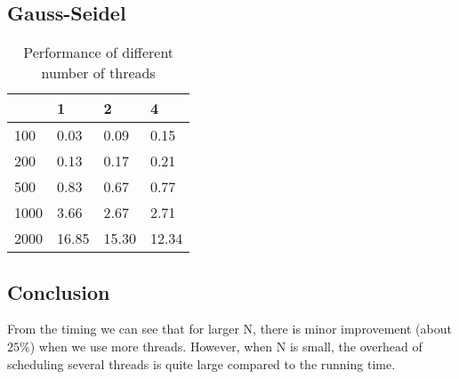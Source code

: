 \documentclass{article}
\begin{document}
    \subsection{Gauss-Seidel}
    \begin{table}[htb!]
        \centering
        \begin{tabular}{|l|l|l|l|}
        \hline
         & 1 & 2 & 4 \\ \hline
        100 & 0.03 & 0.09 & 0.15 \\ \hline
        200 & 0.13 & 0.17 & 0.21 \\ \hline
        500 & 0.83 & 0.67 & 0.77 \\ \hline
        1000 & 3.66 & 2.67 & 2.71 \\ \hline
        2000 & 16.85 & 15.30 & 12.34 \\ \hline
        \end{tabular}
        \caption{Performance of different number of threads}
    \end{table}
    \subsection{Conclusion}
        From the timing we can see that for larger N, there is minor improvement (about $25\%$) when we use more threads. However, when N is small, the overhead of scheduling several threads is quite large compared to the running time.
\end{document}

